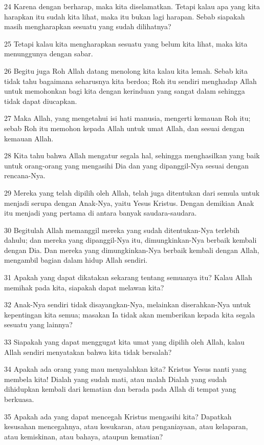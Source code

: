 \par 24 Karena dengan berharap, maka kita diselamatkan. Tetapi kalau apa yang kita harapkan itu sudah kita lihat, maka itu bukan lagi harapan. Sebab siapakah masih mengharapkan sesuatu yang sudah dilihatnya?
\par 25 Tetapi kalau kita mengharapkan sesuatu yang belum kita lihat, maka kita menunggunya dengan sabar.
\par 26 Begitu juga Roh Allah datang menolong kita kalau kita lemah. Sebab kita tidak tahu bagaimana seharusnya kita berdoa; Roh itu sendiri menghadap Allah untuk memohonkan bagi kita dengan kerinduan yang sangat dalam sehingga tidak dapat diucapkan.
\par 27 Maka Allah, yang mengetahui isi hati manusia, mengerti kemauan Roh itu; sebab Roh itu memohon kepada Allah untuk umat Allah, dan sesuai dengan kemauan Allah.
\par 28 Kita tahu bahwa Allah mengatur segala hal, sehingga menghasilkan yang baik untuk orang-orang yang mengasihi Dia dan yang dipanggil-Nya sesuai dengan rencana-Nya.
\par 29 Mereka yang telah dipilih oleh Allah, telah juga ditentukan dari semula untuk menjadi serupa dengan Anak-Nya, yaitu Yesus Kristus. Dengan demikian Anak itu menjadi yang pertama di antara banyak saudara-saudara.
\par 30 Begitulah Allah memanggil mereka yang sudah ditentukan-Nya terlebih dahulu; dan mereka yang dipanggil-Nya itu, dimungkinkan-Nya berbaik kembali dengan Dia. Dan mereka yang dimungkinkan-Nya berbaik kembali dengan Allah, mengambil bagian dalam hidup Allah sendiri.
\par 31 Apakah yang dapat dikatakan sekarang tentang semuanya itu? Kalau Allah memihak pada kita, siapakah dapat melawan kita?
\par 32 Anak-Nya sendiri tidak disayangkan-Nya, melainkan diserahkan-Nya untuk kepentingan kita semua; masakan Ia tidak akan memberikan kepada kita segala sesuatu yang lainnya?
\par 33 Siapakah yang dapat menggugat kita umat yang dipilih oleh Allah, kalau Allah sendiri menyatakan bahwa kita tidak bersalah?
\par 34 Apakah ada orang yang mau menyalahkan kita? Kristus Yesus nanti yang membela kita! Dialah yang sudah mati, atau malah Dialah yang sudah dihidupkan kembali dari kematian dan berada pada Allah di tempat yang berkuasa.
\par 35 Apakah ada yang dapat mencegah Kristus mengasihi kita? Dapatkah kesusahan mencegahnya, atau kesukaran, atau penganiayaan, atau kelaparan, atau kemiskinan, atau bahaya, ataupun kematian?
